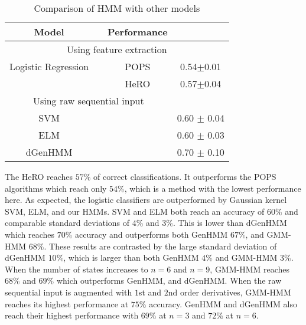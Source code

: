 \begin{table}[!ht]
\center
\caption{Comparison of HMM with other models}
\begin{tabular}{*4c}
\toprule
 Model							&   			    & Performance 	 	\\  
\toprule

\multicolumn{4}{c}{Using feature extraction}    \\ \hline
Logistic Regression	 & & POPS & 0.54$\pm$0.01				  \\
& & HeRO			&   0.57$\pm$0.04\\   \hline
\multicolumn{3}{c}{Using raw sequential input}    \\    \hline  
SVM      & &                       &   0.60 $\pm$ 0.04   			\\
ELM		& &						&   0.60 $\pm$ 0.03   				\\ 
dGenHMM     & &                     &   0.70 $\pm$ 0.10  \\ \hline

\hline
\end{tabular}
\label{table:results:Lin}
\end{table}%


The HeRO reaches $57\%$ of correct classifications.
It outperforms the POPS algorithms which reach only $54\%$, which is a method with the lowest performance here.
As expected, the logistic classifiers are outperformed by Gaussian kernel SVM, ELM, and our HMMs.
SVM and ELM both reach an accuracy of $60\%$ and comparable standard deviations of $4\%$ and $3\%$.
This is lower than dGenHMM which reaches $70\%$ accuracy and outperforms both GenHMM $67\%$, and GMM-HMM $68\%$.
These results are contrasted by the large standard deviation of dGenHMM $10\%$, which is larger than both GenHMM $4\%$ and GMM-HMM $3\%$.
When the number of states increases to $n=6$ and $n=9$, GMM-HMM reaches $68\%$ and $69\%$ which outperforms GenHMM, and dGenHMM.
When the raw sequential input is augmented with $1$st and $2$nd order derivatives, GMM-HMM reaches its highest performance at $75\%$ accuracy.
GenHMM and dGenHMM also reach their highest performance with $69\%$ at $n=3$ and $72\%$ at $n=6$.

